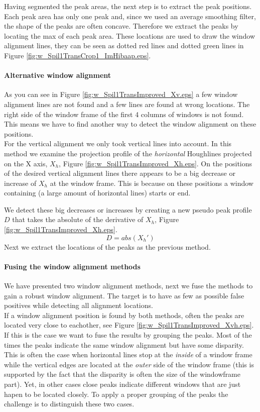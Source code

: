Having segmented the peak areas, the next step is to extract the peak positions. 
Each peak area has only one peak and, since we used an average smoothing filter, the shape of 
the peaks are often concave. Therefore we extract the peaks by locating the max of each peak area. 
These locations are used to draw the window alignment lines, they can be seen
as dotted red lines and dotted green lines in Figure \ref{fig:w_Spil1TransCrop1_ImHibaap.eps}.

\paragraph{Alternative window alignment}
As you can see in Figure \ref{fig:w_Spil1TransImproved_Xv.eps}
a few window alignment lines are not found and a few lines are found at wrong locations.
The right side of the window frame of the first 4 columns of windows is not found.
This means we have to find another way to detect the window alignment on these positions.\\

For the vertical alignment we only took vertical lines into account.
In this method we examine the projection profile of the \emph{horizontal} Houghlines
projected on the X axis, $X_h$, Figure \ref{fig:w_Spil1TransImproved_Xh.eps}.
On the positions of the desired vertical alignment lines there appears to be a 
big decrease or increase of $X_h$ at the window frame. This is because on these
positions a window containing (a large amount of horizontal lines) starts or end.

We detect these big decreases or increases by creating a new pseudo peak profile
$D$ that takes the absolute of the derivative of $X_h$, Figure \ref{fig:w_Spil1TransImproved_Xh.eps}.
\[D = abs( X_{h}')\]
Next we extract the locations of the peaks as the previous method.

\paragraph{Fusing the window alignment methods}
We have presented two window alignment methods, next we fuse the methods to
gain a robust window alignment.
The target is to have as few as possible false positives while detecting all alignment locations.\\

If a window alignment position is found by both methods, often the peaks are
located very close to eachother, see Figure
\ref{fig:w_Spil1TransImproved_Xvh.eps}.  If this is the case we want to fuse the results by grouping the peaks.
Most of the times the peaks indicate the same window alignment but have
some disparity.  This is often the case when horizontal lines stop at the \emph{inside}
of a window frame while the vertical edges are located at the \emph{outer} side of the
window frame (this is supported by the fact that the disparity is often the size of the windowframe part).  
Yet, in other cases close peaks indicate different windows that are just hapen to be
located closely.  To apply a proper grouping of the peaks the challenge is to
distinguish these two cases.\\

